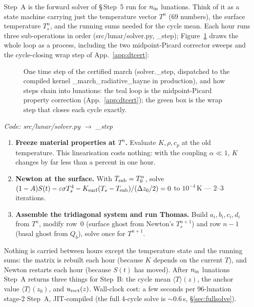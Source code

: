 \documentclass[11pt]{report}
\newcommand{\Tm}{\langle T\rangle}
\newcommand{\code}[1]{{\ttfamily\small #1}}
\begin{document}
Step~A is the forward solver of \S\,Step~5 run for $n_{\rm in}$ lunations. Think
of it as a state machine carrying just the temperature vector $T^n$ (69 numbers),
the surface temperature $T_s^n$, and the running sums needed for the cycle mean.
Each hour runs three sub-operations in order (\code{src/lunar/solver.py},
\code{\_step}); Figure~\ref{fig:marchflow} draws the whole loop as a
process, including the two midpoint-Picard corrector sweeps and the
cycle-closing wrap step of App.~\ref{app:dtcert}:

\begin{figure}[htbp]\centering

\caption{One time step of the certified march
(\code{solver.\_step}, dispatched to the compiled kernel
\code{\_march\_radiative\_hayne} in production), and how steps chain
into lunations: the teal loop is the midpoint-Picard property correction
(App.~\ref{app:dtcert}); the green box is the wrap step that closes each
cycle exactly.}
\label{fig:marchflow}
\end{figure}

{\small\color{dim}\textit{Code: \code{src/lunar/solver.py} $\to$ \code{\_step}}}

\begin{enumerate}[leftmargin=1.4em,itemsep=3pt]
\item \textbf{Freeze material properties at $T^n$.} Evaluate $K,\rho,c_p$ at the
  old temperature. This linearisation costs nothing: with the coupling
  $\alpha\ll1$, $K$ changes by far less than a percent in one hour.
\item \textbf{Newton at the surface.} With $T_{\rm sub}=T_0^n$, solve
  $(1-A)S(t)-\varepsilon\sigma T_s^4 - K_{\rm surf}(T_s-T_{\rm sub})/(\Delta z_0/2)=0$
  to $10^{-4}$\,K --- 2--3 iterations.
\item \textbf{Assemble the tridiagonal system and run Thomas.} Build
  $a_i,b_i,c_i,d_i$ from $T^n$, modify row~0 (surface ghost from Newton's
  $T_s^{n+1}$) and row $n{-}1$ (basal ghost from $Q_b$), solve once for
  $T^{n+1}$.
\end{enumerate}

\noindent Nothing is carried between hours except the temperature state and the
running sums: the matrix is rebuilt each hour (because $K$ depends on the current
$T$), and Newton restarts each hour (because $S(t)$ has moved). After
$n_{\rm in}$ lunations Step~A returns three things for Step~B: the cycle mean
$\Tm(z)$, the anchor value $\Tm(z_0)$, and $u_{\rm rect}(z)$. Wall-clock cost:
a few seconds per 96-lunation stage-2 Step~A, JIT-compiled (the full 4-cycle
solve is $\sim$0.6\,s, \S\ref{sec:fullsolve}).
\end{document}
